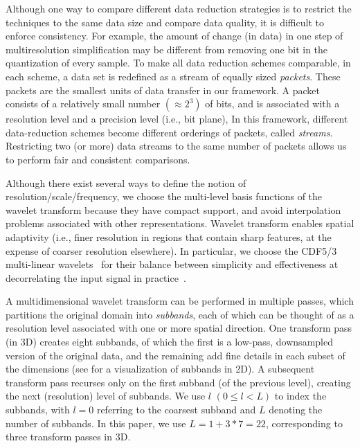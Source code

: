 Although one way to compare different data reduction strategies is to restrict the techniques to the
same data size and compare data quality, it is difficult to enforce consistency. For example, the
amount of change (in data) in one step of multiresolution simplification may be different from
removing one bit in the quantization of every sample. To make all data reduction schemes comparable,
in each scheme, a data set is redefined as a stream of equally sized \emph{packets}. These packets
are the smallest units of data transfer in our framework. A packet consists of a relatively small
number $\left(\approx 2^3\right)$ of bits, and is associated with a resolution level and a precision
level (i.e., bit plane), In this framework, different data-reduction schemes become different
orderings of packets, called \emph{streams}. Restricting two (or more) data streams to the same
number of packets allows us to perform fair and consistent comparisons.

Although there exist several ways to define the notion of resolution/scale/frequency, we choose the
multi-level basis functions of the wavelet transform because they have compact support, and avoid
interpolation problems associated with other representations. Wavelet transform enables spatial
adaptivity (i.e., finer resolution in regions that contain sharp features, at the expense of coarser
resolution elsewhere). In particular, we choose the CDF5/3 multi-linear wavelets~\cite{cdf-wavelets}
for their balance between simplicity and effectiveness at decorrelating the input signal in
practice~\cite{jpeg2000}.

A multidimensional wavelet transform can be performed in multiple passes, which partitions the
original domain into \emph{subbands}, each of which can be thought of as a resolution level
associated with one or more spatial direction. One transform pass (in 3D) creates eight subbands, of
which the first is a low-pass, downsampled version of the original data, and the remaining add fine
details in each subset of the dimensions (see  for a visualization of subbands in
2D). A subsequent transform pass recurses only on the first subband (of the previous level), creating the next (resolution)
level of subbands. We use $l$ $(0 \leq l < L)$ to index the subbands, with $l = 0$ referring to the
coarsest subband and $L$ denoting the number of subbands. In this paper, we use $L=1 + 3*7=22$,
corresponding to three transform passes in 3D.

